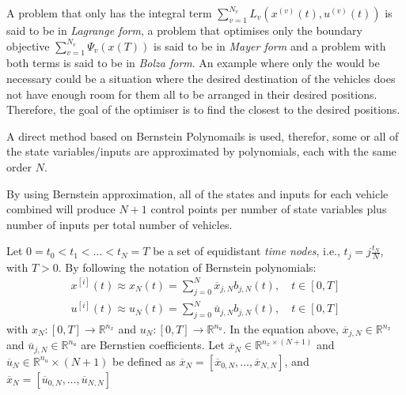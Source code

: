 \par A problem that only has the integral term $\sum_{v=1}^{N_v} L_v(x^{(v)}(t),u^{(v)}(t))$ is said to be in \textit{Lagrange form}, a problem that optimises only the boundary objective $\sum_{v=1}^{N_v} \Psi_v(x(T))$ is said to be in \textit{Mayer form} and a problem with both terms is said to be in \textit{Bolza form}. An example where only the  would be necessary could be a situation where the desired destination of the vehicles does not have enough room for them all to be arranged in their desired positions. Therefore, the goal of the optimiser is to find the closest to the desired positions.

\par A direct method based on Bernstein Polynomails is used, therefor, some or all of the state variables/inputs are approximated by polynomials, each with the same order $N$.

\par By using Bernstein approximation, all of the states and inputs for each vehicle combined will produce $N+1$ control points per number of state variables plus number of inputs per total number of vehicles. 
\par Let $0=t_0<t_1<\dots<t_N=T$ be a set of equidistant \textit{time nodes}, i.e., $t_j= j\frac{t_N}{N}$, with $T>0$. By following the notation of Bernstein polynomials:
\begin{equation}
    \begin{gathered}
        x^{[i]}(t) \approx x_N(t) = \sum_{j=0}^N \overline{x}_{j,N} b_{j,N}(t), \quad t\in[0,T] \\
        u^{[i]}(t) \approx u_N(t) = \sum_{j=0}^N \overline{u}_{j,N} b_{j,N}(t), \quad t\in[0,T]
    \end{gathered}
\end{equation}
with $x_N: [0,T]\rightarrow \mathbb{R}^{n_x}$ and $u_N:[0,T]\rightarrow \mathbb{R}^{n_u}$. In the equation above, $\overline{x}_{j,N}\in \mathbb{R}^{n_x}$ and $\overline{u}_{j,N}\in \mathbb{R}^{n_u}$ are Bernstien coefficients. Let $\overline{x}_N\in \mathbb{R}^{n_x\times (N+1)}$ and $\overline{u}_N\in \mathbb{R}^{n_u}\times(N+1)$ be defined as $\overline{x}_N = [\overline{x}_{0,N},\dots, \overline{x}_{N,N}]$, and $\overline{x}_N = [\overline{u}_{0,N},\dots, \overline{u}_{N,N}]$

